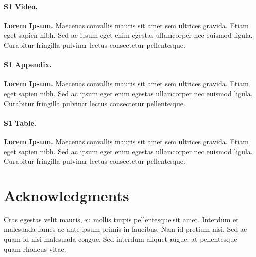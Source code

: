 \documentclass[10pt,letterpaper]{article}
\begin{document}
\paragraph*{S1 Video.}
\label{S1_Video}
{\bf Lorem Ipsum.}  Maecenas convallis mauris sit amet sem ultrices gravida. Etiam eget sapien nibh. Sed ac ipsum eget enim egestas ullamcorper nec euismod ligula. Curabitur fringilla pulvinar lectus consectetur pellentesque.

\paragraph*{S1 Appendix.}
\label{S1_Appendix}
{\bf Lorem Ipsum.} Maecenas convallis mauris sit amet sem ultrices gravida. Etiam eget sapien nibh. Sed ac ipsum eget enim egestas ullamcorper nec euismod ligula. Curabitur fringilla pulvinar lectus consectetur pellentesque.

\paragraph*{S1 Table.}
\label{S1_Table}
{\bf Lorem Ipsum.} Maecenas convallis mauris sit amet sem ultrices gravida. Etiam eget sapien nibh. Sed ac ipsum eget enim egestas ullamcorper nec euismod ligula. Curabitur fringilla pulvinar lectus consectetur pellentesque.

\section*{Acknowledgments}
Cras egestas velit mauris, eu mollis turpis pellentesque sit amet. Interdum et malesuada fames ac ante ipsum primis in faucibus. Nam id pretium nisi. Sed ac quam id nisi malesuada congue. Sed interdum aliquet augue, at pellentesque quam rhoncus vitae.

\nolinenumbers

%
%
% 


\end{document}
